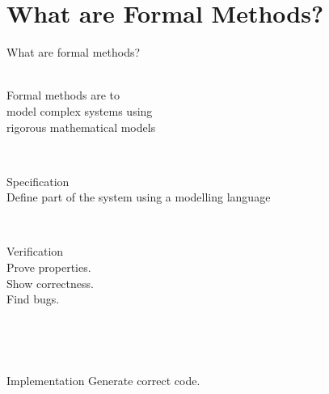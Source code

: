 \documentclass[aspectratio=169]{beamer}
\begin{document}
\frame[plain]{\titlepage}






\section{What are Formal Methods?}


\begin{slide}{What are formal methods?}
  \centering

  \begin{minipage}{0.7\textwidth}
  \Large
  
  \begin{block}{}~\\[-1mm]
    \centering
    Formal methods are  to
    \\
    model \alert{complex systems} using
    \\
    \alert{rigorous mathematical models}

  \end{block}
  \end{minipage}
  \\[7mm]

  \begin{minipage}{0.32\textwidth}
  \begin{alertblock}{Specification}~\\[-1mm]
    Define part of the system using a modelling language
  \end{alertblock}
  \end{minipage}
~~
  \begin{minipage}{0.3\textwidth}
  \begin{alertblock}{Verification}~\\[-1mm]
    Prove properties.\\Show correctness.\\Find bugs.
  \end{alertblock}
  \end{minipage}
~~
  \begin{minipage}{0.28\textwidth}~\\[-1mm]
  \begin{exampleblock}{Implementation}
    Generate correct code.\\~\\
  \end{exampleblock}
  \end{minipage}

\end{slide}
\end{document}
